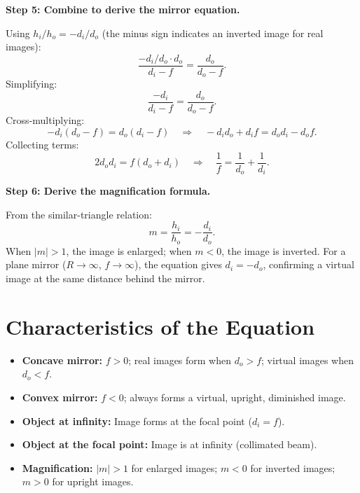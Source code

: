 \textbf{Step 5: Combine to derive the mirror equation.}

Using $h_i/h_o = -d_i/d_o$ (the minus sign indicates an inverted image for real images):
\begin{equation}
\frac{-d_i/d_o \cdot d_o}{d_i - f} = \frac{d_o}{d_o - f}.
\end{equation}
Simplifying:
\begin{equation}
\frac{-d_i}{d_i - f} = \frac{d_o}{d_o - f}.
\end{equation}
Cross-multiplying:
\begin{equation}
-d_i(d_o - f) = d_o(d_i - f) \quad\Longrightarrow\quad -d_i d_o + d_i f = d_o d_i - d_o f.
\end{equation}
Collecting terms:
\begin{equation}
2d_o d_i = f(d_o + d_i) \quad\Longrightarrow\quad \boxed{\frac{1}{f} = \frac{1}{d_o} + \frac{1}{d_i}}.
\end{equation}

\textbf{Step 6: Derive the magnification formula.}

From the similar-triangle relation:
\begin{equation}
m = \frac{h_i}{h_o} = -\frac{d_i}{d_o}.
\end{equation}
When $|m| > 1$, the image is enlarged; when $m < 0$, the image is inverted. For a plane mirror ($R \to \infty$, $f \to \infty$), the equation gives $d_i = -d_o$, confirming a virtual image at the same distance behind the mirror.

\section*{Characteristics of the Equation}

\begin{itemize}
  \item \textbf{Concave mirror:} $f > 0$; real images form when $d_{o} > f$; virtual images when $d_{o} < f$.
  \item \textbf{Convex mirror:} $f < 0$; always forms a virtual, upright, diminished image.
  \item \textbf{Object at infinity:} Image forms at the focal point ($d_{i} = f$).
  \item \textbf{Object at the focal point:} Image is at infinity (collimated beam).
  \item \textbf{Magnification:} $|m| > 1$ for enlarged images; $m < 0$ for inverted images; $m > 0$ for upright images.
\end{itemize}
